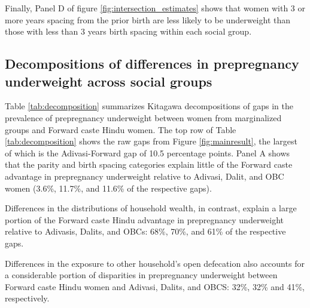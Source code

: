 \documentclass[12pt]{article}
\begin{document}
Finally, Panel D of figure \ref{fig:intersection_estimates} shows that women with 3 or more years spacing from the prior birth are less likely to be underweight than those with less than 3 years birth spacing within each social group. 






\subsection*{Decompositions of differences in prepregnancy underweight across social groups}\label{sec:kitagawa}

Table \ref{tab:decomposition} summarizes Kitagawa decompositions of gaps in the prevalence of prepregnancy underweight between women from marginalized groups and Forward caste Hindu women.  The top row of Table \ref{tab:decomposition} shows the raw gaps from Figure \ref{fig:mainresult}, the largest of which is the Adivasi-Forward gap of 10.5 percentage points.  Panel A shows that the parity and birth spacing categories explain little of the Forward caste advantage in prepregnancy underweight relative to Adivasi, Dalit, and OBC women (3.6\%, 11.7\%, and 11.6\% of the respective gaps). 

Differences in the distributions of household wealth, in contrast, explain a large portion of the Forward caste Hindu advantage in prepregnancy underweight relative to Adivasis, Dalits, and OBCs: 68\%, 70\%, and 61\% of the respective gaps.  

Differences in the exposure to other household's open defecation also accounts for a considerable portion of disparities in prepregnancy underweight between Forward caste Hindu women and Adivasi, Dalits, and OBCS: 32\%, 32\% and 41\%, respectively. 
\end{document}
